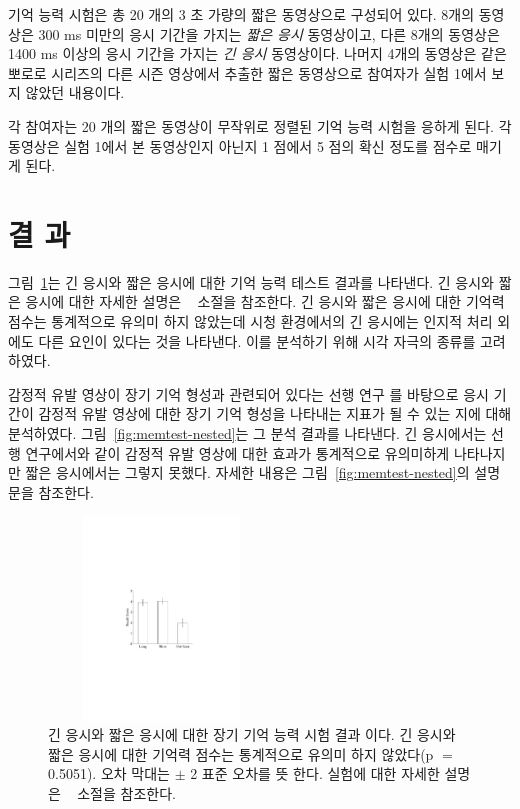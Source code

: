 \documentclass{kcc}
\begin{document}
기억 능력 시험은 총 20 개의 3 초 가량의 짧은 동영상으로 구성되어 있다. 8개의 동영상은 300 ms 미만의 응시 기간을 가지는 \textit{짧은 응시} 동영상이고, 다른 8개의 동영상은 1400 ms 이상의 응시 기간을 가지는 \textit{긴 응시} 동영상이다. 나머지 4개의 동영상은 같은 뽀로로 시리즈의 다른 시즌 영상에서 추출한 짧은 동영상으로 참여자가 실험 1에서 보지 않았던 내용이다.

각 참여자는 20 개의 짧은 동영상이 무작위로 정렬된 기억 능력 시험을 응하게 된다. 각 동영상은 실험 1에서 본 동영상인지 아닌지 1 점에서 5 점의 확신 정도를 점수로 매기게 된다. 


\section{결 과}
그림~\ref{fig:memtest-leng}는 긴 응시와 짧은 응시에 대한 기억 능력 테스트 결과를 나타낸다. 긴 응시와 짧은 응시에 대한 자세한 설명은 ~ 소절을 참조한다. 긴 응시와 짧은 응시에 대한 기억력 점수는 통계적으로 유의미 하지 않았는데 시청 환경에서의 긴 응시에는 인지적 처리 외에도 다른 요인이 있다는 것을 나타낸다. 이를 분석하기 위해 시각 자극의 종류를 고려하였다.

감정적 유발 영상이 장기 기억 형성과 관련되어 있다는 선행 연구 \cite{Cahill1996amyg,Cahill1998baso}를 바탕으로 응시 기간이 감정적 유발 영상에 대한 장기 기억 형성을 나타내는 지표가 될 수 있는 지에 대해 분석하였다. 그림~\ref{fig:memtest-nested}는 그 분석 결과를 나타낸다. 긴 응시에서는 선행 연구에서와 같이 감정적 유발 영상에 대한 효과가 통계적으로 유의미하게 나타나지만 짧은 응시에서는 그렇지 못했다. 자세한 내용은 그림~\ref{fig:memtest-nested}의 설명문을 참조한다.

\begin{figure}
  \centerline{\includegraphics[width=60mm,height=54mm,trim=63mm 102mm 66mm 99mm]{./eps/memtest_leng}}
  \caption{긴 응시와 짧은 응시에 대한 장기 기억 능력 시험 결과 이다. 긴 응시와 짧은 응시에 대한 기억력 점수는 통계적으로 유의미 하지 않았다(p $=$ 0.5051). 오차 막대는 $\pm$ 2 표준 오차를 뜻 한다. 실험에 대한 자세한 설명은 ~ 소절을 참조한다.}
  \label{fig:memtest-leng}
\end{figure}
\end{document}
